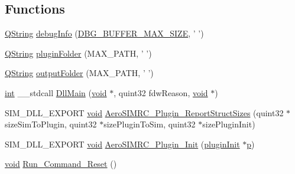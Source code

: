 \subsection*{Functions}
\begin{DoxyCompactItemize}
\item 
\hyperlink{group___u_a_v_objects_plugin_gab9d252f49c333c94a72f97ce3105a32d}{Q\-String} \hyperlink{group___aero_sim_r_c_gab7aaf0bccb3e8d4ab785a824e303a420}{debug\-Info} (\hyperlink{group___aero_sim_r_c_ga4ac56108ad3d382deff679f792d02874}{D\-B\-G\-\_\-\-B\-U\-F\-F\-E\-R\-\_\-\-M\-A\-X\-\_\-\-S\-I\-Z\-E}, ' ')
\item 
\hyperlink{group___u_a_v_objects_plugin_gab9d252f49c333c94a72f97ce3105a32d}{Q\-String} \hyperlink{group___aero_sim_r_c_ga776b2762b88960a5d487d6d6a5bc18a4}{plugin\-Folder} (M\-A\-X\-\_\-\-P\-A\-T\-H, ' ')
\item 
\hyperlink{group___u_a_v_objects_plugin_gab9d252f49c333c94a72f97ce3105a32d}{Q\-String} \hyperlink{group___aero_sim_r_c_ga3e2272a7391bd317e2e58cb38a251e4c}{output\-Folder} (M\-A\-X\-\_\-\-P\-A\-T\-H, ' ')
\item 
\hyperlink{ioapi_8h_a787fa3cf048117ba7123753c1e74fcd6}{int} \-\_\-\-\_\-stdcall \hyperlink{group___aero_sim_r_c_gac93a6e2f9d37b2fe831961496317bffe}{Dll\-Main} (\hyperlink{group___u_a_v_objects_plugin_ga444cf2ff3f0ecbe028adce838d373f5c}{void} $\ast$, quint32 fdw\-Reason, \hyperlink{group___u_a_v_objects_plugin_ga444cf2ff3f0ecbe028adce838d373f5c}{void} $\ast$)
\item 
S\-I\-M\-\_\-\-D\-L\-L\-\_\-\-E\-X\-P\-O\-R\-T \hyperlink{group___u_a_v_objects_plugin_ga444cf2ff3f0ecbe028adce838d373f5c}{void} \hyperlink{group___aero_sim_r_c_ga8ef52f40ca9cf8fb9a0c10021b420e4d}{Aero\-S\-I\-M\-R\-C\-\_\-\-Plugin\-\_\-\-Report\-Struct\-Sizes} (quint32 $\ast$size\-Sim\-To\-Plugin, quint32 $\ast$size\-Plugin\-To\-Sim, quint32 $\ast$size\-Plugin\-Init)
\item 
S\-I\-M\-\_\-\-D\-L\-L\-\_\-\-E\-X\-P\-O\-R\-T \hyperlink{group___u_a_v_objects_plugin_ga444cf2ff3f0ecbe028adce838d373f5c}{void} \hyperlink{group___aero_sim_r_c_ga98e72d84a109612a93351aed8683c42f}{Aero\-S\-I\-M\-R\-C\-\_\-\-Plugin\-\_\-\-Init} (\hyperlink{structplugin_init}{plugin\-Init} $\ast$\hyperlink{glext_8h_aa5367c14d90f462230c2611b81b41d23}{p})
\item 
\hyperlink{group___u_a_v_objects_plugin_ga444cf2ff3f0ecbe028adce838d373f5c}{void} \hyperlink{group___aero_sim_r_c_gacd4d7dbcd8b4676d00471827b255b7ff}{Run\-\_\-\-Command\-\_\-\-Reset} ()
\item 

\end{DoxyCompactItemize}

